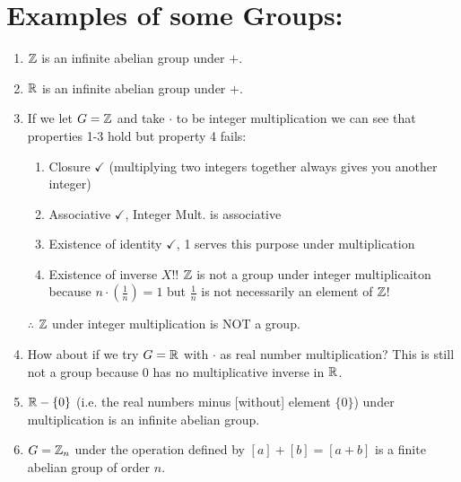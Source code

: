 \section{Examples of some Groups:} 
\begin{enumerate}
    \item ${\mathbb{ Z}}$ is an infinite abelian group under $+$.
    \item ${\mathbb{ R}}$ is an infinite abelian group under $+$.
    \item If we let $G={\mathbb{ Z}}$ and take $\cdot$ to be integer multiplication we can see that properties 1-3 hold but property 4 fails:
    \begin{enumerate}[label=\roman*]
        \item Closure $\checkmark$ (multiplying two integers together always gives you another integer)
        \item Associative $\checkmark$, Integer Mult. is associative
        \item Existence of identity $\checkmark$, 1 serves this purpose under multiplication
        \item Existence of inverse $X$!! ${\mathbb{ Z}}$ is not a group under integer multiplicaiton because $n\cdot (\frac{1}{n})=1$ but $\frac{1}{n}$ is not necessarily an element of ${\mathbb{ Z}}$!
    \end{enumerate}
    $\therefore$ ${\mathbb{ Z}}$ under integer multiplication is NOT a group.
    \item How about if we try $G={\mathbb{ R}}$ with $\cdot$ as real number multiplication? This is still not a group because 0 has no multiplicative inverse in ${\mathbb{ R}}$. 
    \item ${\mathbb{ R}}-\{0\}$ (i.e. the real numbers minus [without] element $\{0\}$) under multiplication is an infinite abelian group.
    \item $G={\mathbb{ Z}}_n$ under the operation defined by $[a]+[b]=[a+b]$ is a finite abelian group of order $n$.
\end{enumerate}
